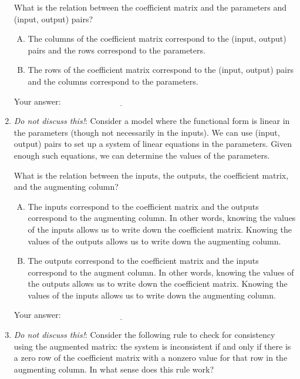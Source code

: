 \documentclass[10pt]{amsart}
\begin{document}
\begin{enumerate}
  What is the relation between the coefficient matrix and the
  parameters and (input, output) pairs?

  \begin{enumerate}[(A)]
  \item The columns of the coefficient matrix correspond to the
    (input, output) pairs and the rows correspond to the parameters.
  \item The rows of the coefficient matrix correspond to the
    (input, output) pairs and the columns correspond to the parameters.
  \end{enumerate}

  \vspace{0.1in}
  Your answer: $\underline{\qquad\qquad\qquad\qquad\qquad\qquad\qquad}$
  \vspace{0.1in}

\item {\em Do not discuss this!}: Consider a model where the
  functional form is linear in the parameters (though not necessarily
  in the inputs). We can use (input, output) pairs to set up a system
  of linear equations in the parameters. Given enough such equations,
  we can determine the values of the parameters.

  What is the relation between the inputs, the outputs, the
  coefficient matrix, and the augmenting column?

  \begin{enumerate}[(A)]
  \item The inputs correspond to the coefficient matrix and the
    outputs correspond to the augmenting column. In other words,
    knowing the values of the inputs allows us to write down the
    coefficient matrix. Knowing the values of the outputs allows us to
    write down the augmenting column.
  \item The outputs correspond to the coefficient matrix and the
    inputs correspond to the augment column. In other words, knowing
    the values of the outputs allows us to write down the coefficient
    matrix. Knowing the values of the inputs allows us to write down
    the augmenting column.
  \end{enumerate}

  \vspace{0.1in}
  Your answer: $\underline{\qquad\qquad\qquad\qquad\qquad\qquad\qquad}$
  \vspace{0.1in}

\item {\em Do not discuss this!}: Consider the following rule to check
  for consistency using the augmented matrix: the system is
  inconsistent if and only if there is a zero row of the coefficient
  matrix with a nonzero value for that row in the augmenting
  column. In what sense does this rule work?


\end{enumerate}
\end{document}
